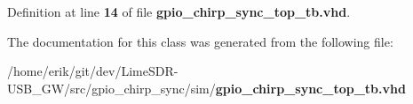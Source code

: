 Definition at line {\bf 14} of file {\bf gpio\+\_\+chirp\+\_\+sync\+\_\+top\+\_\+tb.\+vhd}.



The documentation for this class was generated from the following file\+:\begin{DoxyCompactItemize}
\item 
/home/erik/git/dev/\+Lime\+S\+D\+R-\/\+U\+S\+B\+\_\+\+G\+W/src/gpio\+\_\+chirp\+\_\+sync/sim/{\bf gpio\+\_\+chirp\+\_\+sync\+\_\+top\+\_\+tb.\+vhd}\end{DoxyCompactItemize}
